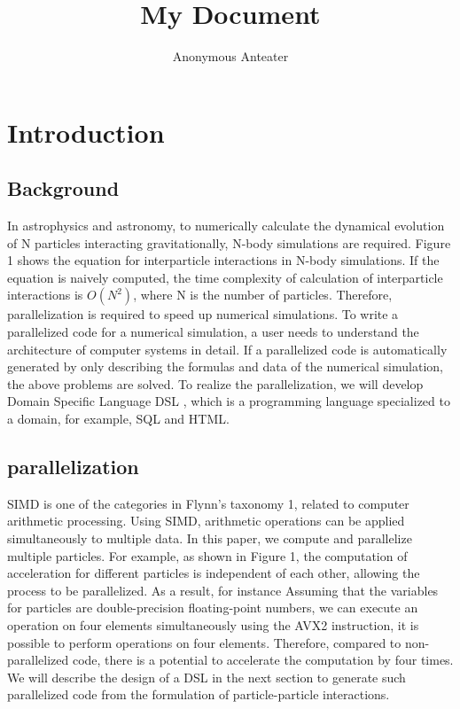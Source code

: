 \documentclass{jarticle}
\title{My Document}
\author{Anonymous Anteater}
\begin{document}
\maketitle
\begin{abstract}

\end{abstract}
\section{Introduction}



\subsection{Background}
In astrophysics and astronomy, to numerically calculate the dynamical 
evolution of N particles interacting gravitationally, N-body simulations 
are required. Figure 1 shows the equation for interparticle interactions 
in N-body simulations. If the equation is naively computed, the time
complexity of calculation of interparticle interactions is 
\begin{math}O(N^2) \end{math}, where 
N is the number of particles. Therefore, parallelization is required to
speed up numerical simulations. To write a parallelized code for a 
numerical simulation, a user needs to understand the architecture of 
computer systems in  detail. If a parallelized code is automatically
generated by only describing the formulas and data of the numerical
simulation, the above problems are solved. To realize the parallelization,
we will develop Domain Specific Language  DSL \rparen, which is a 
programming language specialized to a domain, for example, SQL and HTML.


\subsection{parallelization}
SIMD is one of the categories in Flynn's taxonomy 1, related to computer arithmetic
 processing. Using SIMD, arithmetic operations can be applied simultaneously to
multiple data. In this paper, we compute and parallelize multiple particles. For example, 
as shown in Figure 1, the computation of acceleration for different particles is independent
of each other, allowing the process to be parallelized. As a result, for instance Assuming 
that the variables for particles are double-precision floating-point numbers, we can execute 
an operation on four elements simultaneously using the AVX2 instruction, it is possible to 
perform operations on four elements. Therefore, compared to non-parallelized code, there is
a potential to accelerate the computation by four times. We will describe the design of a 
DSL in the next section to generate such parallelized code from the formulation of particle-particle interactions.
\end{document}
